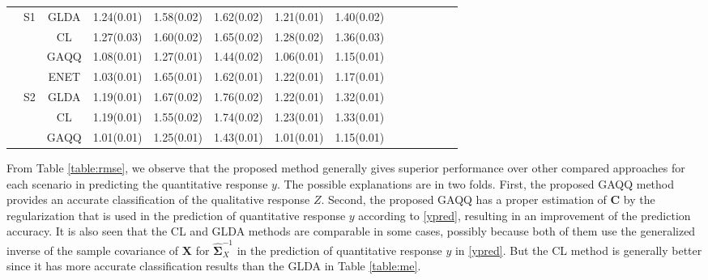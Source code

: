 \documentclass[12pt]{article}
\begin{document}
\begin{table}
\begin{center}
\begin{tabular}{cccrrrrrrrrrrr}
&S1&GLDA&1.24(0.01) &1.58(0.02) &1.62(0.02) &1.21(0.01) &1.40(0.02) \\
&  &CL  &1.27(0.03) &1.60(0.02) &1.65(0.02) &1.28(0.02) &1.36(0.03) \\
&  &GAQQ&1.08(0.01) &1.27(0.01) &1.44(0.02) &1.06(0.01) &1.15(0.01) \\
\hhline{~---------}
&  &ENET&1.03(0.01) &1.65(0.01) &1.62(0.01) &1.22(0.01) &1.17(0.01) \\
&S2&GLDA&1.19(0.01) &1.67(0.02) &1.76(0.02) &1.22(0.01) &1.32(0.01) \\
&  &CL  &1.19(0.01) &1.55(0.02) &1.74(0.02) &1.23(0.01) &1.33(0.01) \\
&  &GAQQ&1.01(0.01) &1.25(0.01) &1.43(0.01) &1.01(0.01) &1.15(0.01) \\
\hline \hline
\end{tabular}
\end{center}
\end{table}

From Table \ref{table:rmse}, we observe that the proposed method generally gives superior performance over other compared approaches for each scenario in predicting the quantitative response $y$.
The possible explanations are in two folds.
First, the proposed GAQQ method provides an accurate classification of the qualitative response $Z$.
Second, the proposed GAQQ has a proper estimation of $\bm C$ by the regularization that is used in the prediction of quantitative response $y$ according to \eqref{ypred}, resulting in an improvement of the prediction accuracy.
It is also seen that the CL and GLDA methods are comparable in some cases,
possibly because both of them use the generalized inverse of the sample covariance of $\bm X$ for $\hat{\bm \Sigma}_{X}^{-1}$ in the prediction of quantitative response $y$ in \eqref{ypred}.
But the CL method is generally better since it has more accurate classification results than the GLDA in Table \ref{table:me}.

\end{document}

